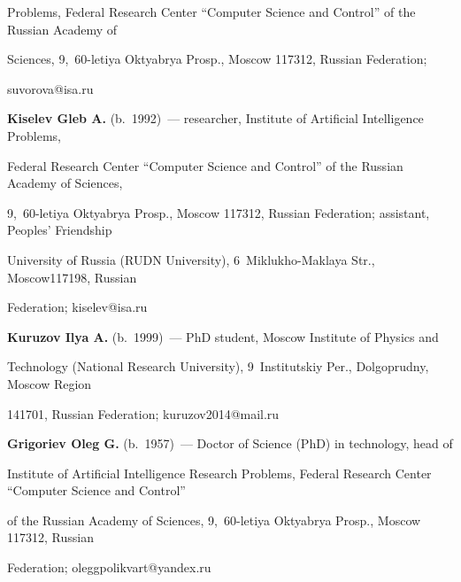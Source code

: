 Problems, Federal Research Center ``Computer Science and Control'' of the Russian Academy of 

Sciences, 9,~60-letiya Oktyabrya Prosp., Moscow 117312, Russian Federation; 

\mbox{suvorova@isa.ru}

  

  \vspace*{3pt}

  

  

  \noindent

  \textbf{Kiselev Gleb A.} (b.\ 1992)~--- researcher, Institute of Artificial Intelligence Problems, 

Federal Research Center ``Computer Science and Control'' of the Russian Academy of Sciences, 

9,~60-letiya Oktyabrya Prosp., Moscow 117312, Russian Federation; assistant, Peoples' Friendship 

University of Russia (RUDN University), 6~Miklukho-Maklaya Str., Moscow117198, Russian 

Federation; \mbox{kiselev@isa.ru}

  

  \vspace*{3pt}

  

  \noindent

  \textbf{Kuruzov Ilya A.} (b.\ 1999)~--- PhD student, Moscow Institute of Physics and 

Technology (National Research University), 9~Institutskiy Per., Dolgoprudny, Moscow Region 

141701, Russian Federation; \mbox{kuruzov2014@mail.ru}

  

  \vspace*{3pt}

  

  \noindent

  \textbf{Grigoriev Oleg G.} (b.\ 1957)~--- Doctor of Science (PhD) in technology, head of 

Institute of Artificial Intelligence Research Problems, Federal Research Center ``Computer Science and Control'' 

of the Russian Academy of Sciences, 9,~60-letiya Oktyabrya Prosp., Moscow 117312, Russian 

Federation; \mbox{oleggpolikvart@yandex.ru}

  





\label{end\stat}



\renewcommand{\bibname}{\protect\rm Литература} 

  

